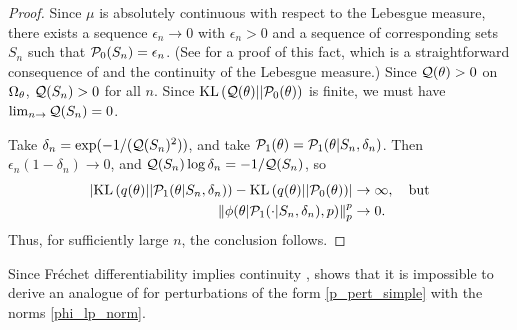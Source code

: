 \begin{thm}
\begin{proof}
Since $\mu$ is absolutely continuous with respect to the Lebesgue measure, there
exists a sequence $\epsilon_n \rightarrow 0$ with $\epsilon_n > 0$ and a
sequence of corresponding sets $S_n$ such that $\mathcal{P}_{0}(S_n) = \epsilon_n$. (See
 for a proof of this fact, which is a
straightforward consequence of \citet[Proposition 15.5]{nielsen:1997:measure}
and the continuity of the Lebesgue measure.) Since $\mathcal{Q}(\theta) > 0$ on
$\Omega_{\theta}$, $\mathcal{Q}(S_n) > 0$ for all $n$.  Since $\mathrm{KL}\left(\mathcal{Q}(\theta) ||
\mathcal{P}_{0}(\theta)\right)$ is finite, we must have $\lim_{n \rightarrow} \mathcal{Q}(S_n) = 0$.

Take $\delta_n  = \exp(-1 / (\mathcal{Q}(S_n)^2))$, and take $\mathcal{P}_{1}(\theta) =
\mathcal{P}_{1}(\theta \vert S_n, \delta_n)$.  Then $\epsilon_n (1 - \delta_n) \rightarrow
0$, and $\mathcal{Q}(S_n)\log \delta_n = -1 / \mathcal{Q}(S_n)$, so
%
\begin{align*}
%
\abs{\KL{q(\theta) || \palt(\theta \vert S_n, \delta_n)} -
    \KL{q(\theta) || \pbase(\theta)}} \rightarrow{}& \infty, \quad \textrm{but}\\
%
\norm{\phi(\theta \vert \palt(\cdot \vert S_n, \delta_n), p)}_p^p
    \rightarrow{}& 0.
%
\end{align*}
%
Thus, for sufficiently large $n$, the conclusion follows.
%
\end{proof}
%
\end{thm}

Since Fr{\'e}chet differentiability implies continuity \citep[Proposition 4.8
(d)]{zeidler:2013:functional},  shows that it is
impossible to derive an analogue of  for perturbations of
the form \eqref{p_pert_simple} with the norms \eqref{phi_lp_norm}.

